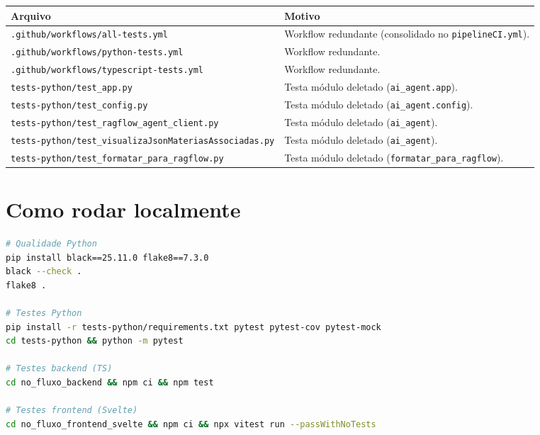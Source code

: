 \documentclass[11pt,a4paper]{article}
\begin{document}
\begin{table}[h]
\centering
\small
\begin{tabular}{@{}p{6.8cm}p{7.5cm}@{}}
\toprule
\textbf{Arquivo} & \textbf{Motivo} \\
\midrule
\texttt{.github/workflows/all-tests.yml} & Workflow redundante (consolidado no \texttt{pipelineCI.yml}). \\
\texttt{.github/workflows/python-tests.yml} & Workflow redundante. \\
\texttt{.github/workflows/typescript-tests.yml} & Workflow redundante. \\
\texttt{tests-python/test\_app.py} & Testa módulo deletado (\texttt{ai\_agent.app}). \\
\texttt{tests-python/test\_config.py} & Testa módulo deletado (\texttt{ai\_agent.config}). \\
\texttt{tests-python/test\_ragflow\_agent\_client.py} & Testa módulo deletado (\texttt{ai\_agent}). \\
\texttt{tests-python/test\_visualizaJsonMateriasAssociadas.py} & Testa módulo deletado (\texttt{ai\_agent}). \\
\texttt{tests-python/test\_formatar\_para\_ragflow.py} & Testa módulo deletado (\texttt{formatar\_para\_ragflow}). \\
\bottomrule
\end{tabular}
\end{table}

\section{Como rodar localmente}

\begin{lstlisting}[language=bash]
# Qualidade Python
pip install black==25.11.0 flake8==7.3.0
black --check .
flake8 .

# Testes Python
pip install -r tests-python/requirements.txt pytest pytest-cov pytest-mock
cd tests-python && python -m pytest

# Testes backend (TS)
cd no_fluxo_backend && npm ci && npm test

# Testes frontend (Svelte)
cd no_fluxo_frontend_svelte && npm ci && npx vitest run --passWithNoTests
\end{lstlisting}

\end{document}
